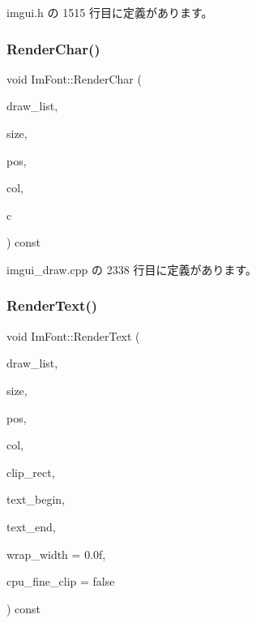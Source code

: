  imgui.\+h の 1515 行目に定義があります。

\mbox{\label{struct_im_font_af602fe8f445ae4142436ee3e6baa3ede}} 
\subsubsection{\texorpdfstring{Render\+Char()}{RenderChar()}}
{\footnotesize\ttfamily void Im\+Font\+::\+Render\+Char (\begin{DoxyParamCaption}\item[{\mbox{\hyperlink{struct_im_draw_list}{Im\+Draw\+List}} $\ast$}]{draw\+\_\+list,  }\item[{float}]{size,  }\item[{\mbox{\hyperlink{struct_im_vec2}{Im\+Vec2}}}]{pos,  }\item[{\mbox{\hyperlink{imgui_8h_a118cff4eeb8d00e7d07ce3d6460eed36}{Im\+U32}}}]{col,  }\item[{unsigned short}]{c }\end{DoxyParamCaption}) const}



 imgui\+\_\+draw.\+cpp の 2338 行目に定義があります。

\mbox{\label{struct_im_font_a2877acf1cfcd964bc2e7fe600a08849e}} 
\subsubsection{\texorpdfstring{Render\+Text()}{RenderText()}}
{\footnotesize\ttfamily void Im\+Font\+::\+Render\+Text (\begin{DoxyParamCaption}\item[{\mbox{\hyperlink{struct_im_draw_list}{Im\+Draw\+List}} $\ast$}]{draw\+\_\+list,  }\item[{float}]{size,  }\item[{\mbox{\hyperlink{struct_im_vec2}{Im\+Vec2}}}]{pos,  }\item[{\mbox{\hyperlink{imgui_8h_a118cff4eeb8d00e7d07ce3d6460eed36}{Im\+U32}}}]{col,  }\item[{const \mbox{\hyperlink{struct_im_vec4}{Im\+Vec4}} \&}]{clip\+\_\+rect,  }\item[{const char $\ast$}]{text\+\_\+begin,  }\item[{const char $\ast$}]{text\+\_\+end,  }\item[{float}]{wrap\+\_\+width = {\ttfamily 0.0f},  }\item[{bool}]{cpu\+\_\+fine\+\_\+clip = {\ttfamily false} }\end{DoxyParamCaption}) const}



